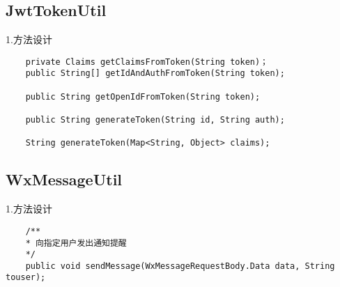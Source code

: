 \subsection{JwtTokenUtil}
1.方法设计
\begin{lstlisting}
    private Claims getClaimsFromToken(String token)；
    public String[] getIdAndAuthFromToken(String token);

    public String getOpenIdFromToken(String token);

    public String generateToken(String id, String auth);

    String generateToken(Map<String, Object> claims);
\end{lstlisting}

\subsection{WxMessageUtil}
1.方法设计
\begin{lstlisting}
    /**
    * 向指定用户发出通知提醒  
    */ 
    public void sendMessage(WxMessageRequestBody.Data data, String touser);
\end{lstlisting}

 